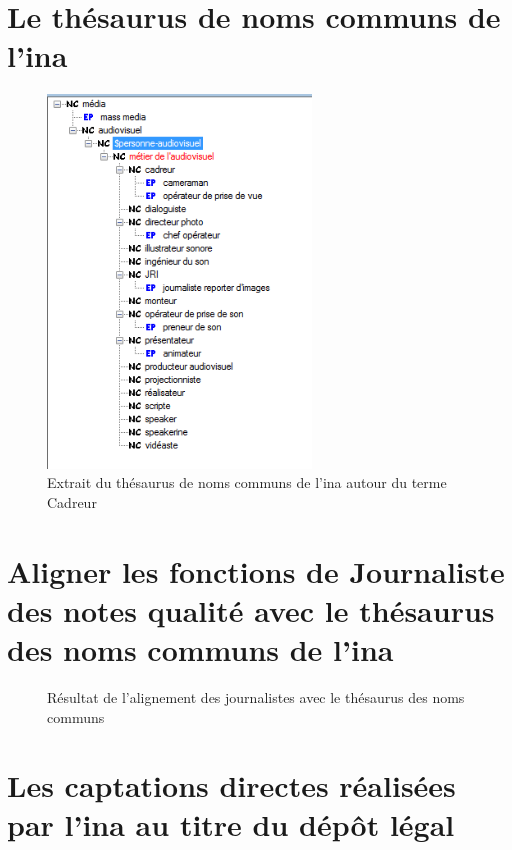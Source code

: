 \chapter{\label{annexe_thesaurus}Le thésaurus de noms communs de l'\ac{ina}}

\begin{figure}[!h]
	\centering
	\includegraphics[width=7cm]{images/cadreur_hierarchie.png}
	\medskip
	\caption[Extrait du thésaurus de noms communs de l'\ac{ina}]{Extrait du thésaurus de noms communs de l'\ac{ina} autour du terme \og Cadreur\fg{}}
\end{figure}

\chapter{\label{annexe_alignement_journaliste}Aligner les fonctions de \og Journaliste\fg{} des notes qualité avec le thésaurus des noms communs de l'\ac{ina}}

\begin{figure}[!h]
	\centering
	\caption{Résultat de l'alignement des journalistes avec le thésaurus des noms communs}
	\label{alignement_journaliste}
\end{figure}

\chapter{\label{annexe_dl_captation}Les captations directes réalisées par l'\ac{ina} au titre du dépôt légal}

